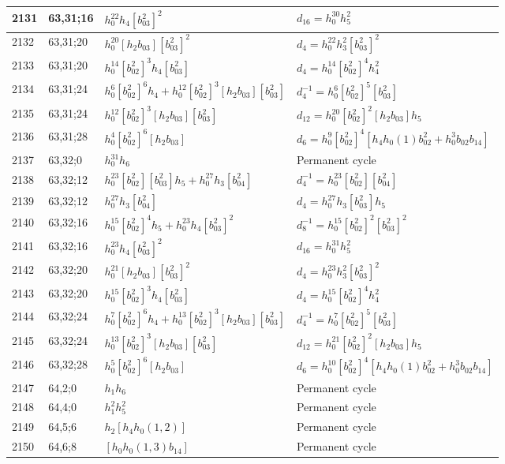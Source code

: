 \documentclass{article}
\begin{document}
\begin{longtable}{|l|l|>{\raggedright\arraybackslash}p{6cm}|>{\raggedright\arraybackslash}p{6cm}|}
2131 & 63,31;16 & $h_0^{22}h_4[b_{03}^2]^2$ &$d_{16}=h_0^{30}h_5^2$\\
\hline
2132 & 63,31;20 & $h_0^{20}[h_2b_{03}][b_{03}^2]^2$ &$d_{4}=h_0^{22}h_3^2[b_{03}^2]^2$\\
2133 & 63,31;20 & $h_0^{14}[b_{02}^2]^3h_4[b_{03}^2]$ &$d_{4}=h_0^{14}[b_{02}^2]^4h_4^2$\\
\hline
2134 & 63,31;24 & $h_0^6[b_{02}^2]^6h_4 + h_0^{12}[b_{02}^2]^3[h_2b_{03}][b_{03}^2]$ & $d_{4}^{-1}=h_0^6[b_{02}^2]^5[b_{03}^2]$\\
2135 & 63,31;24 & $h_0^{12}[b_{02}^2]^3[h_2b_{03}][b_{03}^2]$ &$d_{12}=h_0^{20}[b_{02}^2]^2[h_2b_{03}]h_5$\\
\hline
2136 & 63,31;28 & $h_0^4[b_{02}^2]^6[h_2b_{03}]$ &$d_{6}=h_0^9[b_{02}^2]^4[h_4h_0(1)b_{02}^2 + h_0^3b_{02}b_{14}]$\\
\hline
2137 & 63,32;0 & $h_0^{31}h_6$ & Permanent cycle\\
\hline
2138 & 63,32;12 & $h_0^{23}[b_{02}^2][b_{03}^2]h_5 + h_0^{27}h_3[b_{04}^2]$ & $d_{4}^{-1}=h_0^{23}[b_{02}^2][b_{04}^2]$\\
2139 & 63,32;12 & $h_0^{27}h_3[b_{04}^2]$ &$d_{4}=h_0^{27}h_3[b_{03}^2]h_5$\\
\hline
2140 & 63,32;16 & $h_0^{15}[b_{02}^2]^4h_5 + h_0^{23}h_4[b_{03}^2]^2$ & $d_{8}^{-1}=h_0^{15}[b_{02}^2]^2[b_{03}^2]^2$\\
2141 & 63,32;16 & $h_0^{23}h_4[b_{03}^2]^2$ &$d_{16}=h_0^{31}h_5^2$\\
\hline
2142 & 63,32;20 & $h_0^{21}[h_2b_{03}][b_{03}^2]^2$ &$d_{4}=h_0^{23}h_3^2[b_{03}^2]^2$\\
2143 & 63,32;20 & $h_0^{15}[b_{02}^2]^3h_4[b_{03}^2]$ &$d_{4}=h_0^{15}[b_{02}^2]^4h_4^2$\\
\hline
2144 & 63,32;24 & $h_0^7[b_{02}^2]^6h_4 + h_0^{13}[b_{02}^2]^3[h_2b_{03}][b_{03}^2]$ & $d_{4}^{-1}=h_0^7[b_{02}^2]^5[b_{03}^2]$\\
2145 & 63,32;24 & $h_0^{13}[b_{02}^2]^3[h_2b_{03}][b_{03}^2]$ &$d_{12}=h_0^{21}[b_{02}^2]^2[h_2b_{03}]h_5$\\
\hline
2146 & 63,32;28 & $h_0^5[b_{02}^2]^6[h_2b_{03}]$ &$d_{6}=h_0^{10}[b_{02}^2]^4[h_4h_0(1)b_{02}^2 + h_0^3b_{02}b_{14}]$\\
\hline
2147 & 64,2;0 & $h_1h_6$ & Permanent cycle\\
\hline
2148 & 64,4;0 & $h_1^2h_5^2$ & Permanent cycle\\
\hline
2149 & 64,5;6 & $h_2[h_4h_0(1, 2)]$ & Permanent cycle\\
\hline
2150 & 64,6;8 & $[h_0h_0(1, 3)b_{14}]$ & Permanent cycle\\

\end{longtable}
\end{document}
